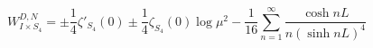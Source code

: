 \begin{equation}
W^{D,N}_{I\times S_4}=\pm\frac14\zeta'_{S_4}(0)
\pm\frac14\zeta_{S_4}(0)\log\mu^2
-\frac{1}{16}\sum^\infty_{n=1}\frac{\cosh nL}{n(\sinh nL)^4}
\end{equation}

